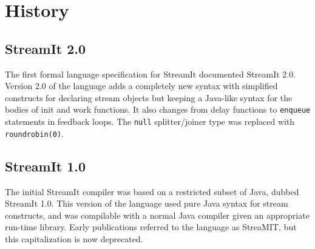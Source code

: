 \documentclass[11pt]{article}
\begin{document}
  


\section{History}

\subsection{StreamIt 2.0}

The first formal language specification for StreamIt documented
StreamIt 2.0.  Version 2.0 of the language adds a completely new
syntax with simplified constructs for declaring stream objects but
keeping a Java-like syntax for the bodies of init and work functions.
It also changes
from delay functions to \lstinline|enqueue| statements in feedback
loops.  The \lstinline|null| splitter/joiner type was replaced with
\lstinline|roundrobin(0)|.

\subsection{StreamIt 1.0}

The initial StreamIt compiler was based on a restricted subset of
Java, dubbed StreamIt 1.0.  This version of the language used pure
Java syntax for stream constructs, and was compilable with a normal
Java compiler given an appropriate run-time library.  Early
publications referred to the language as StreaMIT, but this
capitalization is now deprecated.



\end{document}
